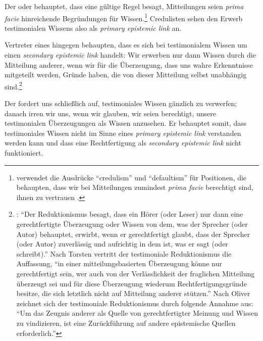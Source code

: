 \begin{nummerierung}
\item Der  oder  behauptet,
dass eine gültige Regel besagt, Mitteilungen seien \emph{prima facie}
hinreichende Begründungen für
Wissen.\footnote{\label{Fussnote:BegriffdesCredulismus}
verwendet die Ausdrücke \enquote{credulism} und \enquote{defaultism} für
Positionen, die behaupten, dass wir bei Mitteilungen zumindest \emph{prima
facie} berechtigt sind, ihnen zu vertrauen
\parencite[vgl.][48]{Wilholt:SozialeErkenntnistheorie2007}.} Credulisten sehen
den Erwerb testimonialen Wissens also als \emph{primary epistemic link} an.
\item Vertreter eines  hingegen
behaupten, dass es sich bei testimonialem Wissen um einen \emph{secondary epistemic link}
handelt: Wir erwerben nur dann Wissen durch die Mitteilung anderer, wenn wir
für die Überzeugung, dass uns wahre Erkenntnisse mitgeteilt werden, Gründe
haben, die von dieser Mitteilung selbst unabhängig
sind.\footnote{\cite[Vgl.][533]{Grundmann:AnalytischeEinfuehrungindieErkenntnistheorie2008}:
\enquote{Der Reduktionismus besagt, dass ein Hörer (oder Leser) nur dann eine
gerechtfertigte Überzeugung oder Wissen von dem, was der Sprecher (oder Autor)
behauptet, erwirbt, wenn er gerechtfertigt glaubt, dass der Sprecher (oder
Autor) zuverlässig und aufrichtig in dem ist, was er sagt (oder schreibt).} Nach
Torsten \textcite[][48]{Wilholt:SozialeErkenntnistheorie2007} vertritt der
testimoniale Reduktionismus die Auffassung, \enquote{in einer
mitteilungsbasierten Überzeugung könne nur gerechtfertigt sein, wer auch von der
Verlässlichkeit der fraglichen Mitteilung überzeugt sei und für diese
Überzeugung wiederum Rechtfertigungsgründe besitze, die sich letztlich nicht auf
Mitteilung anderer stützen.} Nach Oliver
\textcite[][358]{Scholz:DasZeugnisanderer2001} zeichnet sich der testimoniale
Reduktionismus durch folgende Annahme aus:
\enquote{Um das Zeugnis anderer als Quelle von gerechtfertigter Meinung und
Wissen zu vindizieren, ist eine Zurückführung auf andere epistemische Quellen erforderlich.}}
\item Der  fordert uns schließlich auf, testimoniales Wissen gänzlich zu
verwerfen; danach irren wir uns, wenn wir glauben, wir seien berechtigt, unsere
testimonialen Überzeugungen als Wissen anzusehen. Er behauptet somit, dass
testimoniales Wissen nicht im Sinne eines \emph{primary epistemic link}
verstanden werden kann und dass eine Rechtfertigung als \emph{secondary
epistemic link} nicht funktioniert.
\end{nummerierung}


